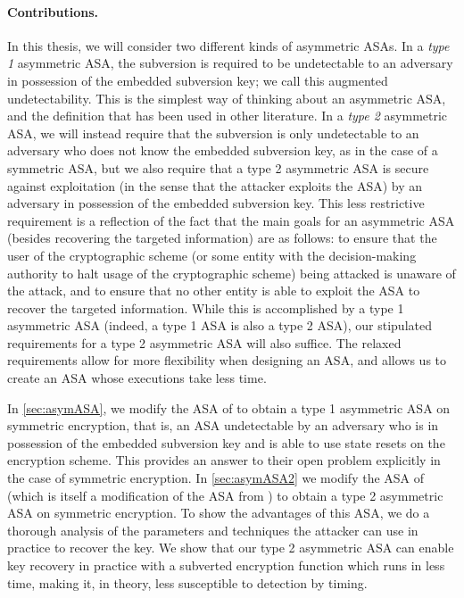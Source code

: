 \paragraph{Contributions.}
In this thesis, we will consider two different kinds of asymmetric ASAs. In a \emph{type 1} asymmetric ASA, the subversion is required to be undetectable to an adversary in possession of the embedded subversion key; we call this augmented undetectability. This is the simplest way of thinking about an asymmetric ASA, and the definition that has been used in other literature. In a \emph{type 2} asymmetric ASA, we will instead require that the subversion is only undetectable to an adversary who does not know the embedded subversion key, as in the case of a symmetric ASA, but we also require that a type 2 asymmetric ASA is secure against exploitation (in the sense that the attacker exploits the ASA) by an adversary in possession of the embedded subversion key. This less restrictive requirement is a reflection of the fact that the main goals for an asymmetric ASA (besides recovering the targeted information) are as follows: to ensure that the user of the cryptographic scheme (or some entity with the decision-making authority to halt usage of the cryptographic scheme) being attacked is unaware of the attack, and to ensure that no other entity is able to exploit the ASA to recover the targeted information. While this is accomplished by a type 1 asymmetric ASA (indeed, a type 1 ASA is also a type 2 ASA), our stipulated requirements for a type 2 asymmetric ASA will also suffice. The relaxed requirements allow for more flexibility when designing an ASA, and allows us to create an ASA whose executions take less time.

In \autoref{sec:asymASA}, we modify the ASA of \cite{C:BelPatRog14} to obtain a type 1 asymmetric ASA on symmetric encryption, that is, an ASA undetectable by an adversary who is in possession of the embedded subversion key and is able to use state resets on the encryption scheme. This provides an answer to their open problem explicitly in the case of symmetric encryption. In \autoref{sec:asymASA2} we modify the ASA of \cite{CCS:BelJaeKan15} (which is itself a modification of the ASA from \cite{C:BelPatRog14}) to obtain a type 2 asymmetric ASA on symmetric encryption. To show the advantages of this ASA, we do a thorough analysis of the parameters and techniques the attacker can use in practice to recover the key. We show that our type 2 asymmetric ASA can enable key recovery in practice with a subverted encryption function which runs in less time, making it, in theory, less susceptible to detection by timing.

